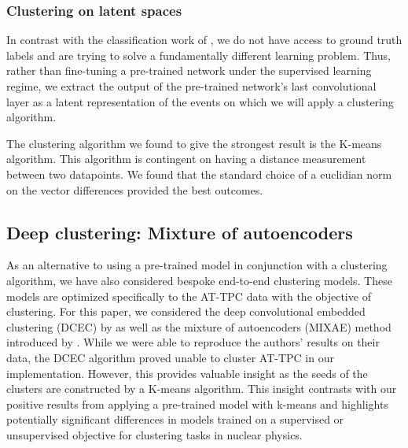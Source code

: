\documentclass[review,number,sort&compress]{elsarticle}
\begin{document}
\subsubsection{Clustering on latent spaces}



In contrast with the classification work of \citet{Kuchera2019}, we do not have access to ground truth labels and are trying to solve a fundamentally different learning problem. Thus, rather than fine-tuning a pre-trained network under the supervised learning regime, we extract the output of the pre-trained network's last convolutional layer as a latent representation of the events on which we will apply a clustering algorithm. 

The clustering algorithm we found to give the strongest result is the K-means algorithm. This algorithm is contingent on having a distance measurement between two datapoints. We found that the standard choice of a euclidian norm on the vector differences provided the best outcomes.



\subsection{Deep clustering: Mixture of autoencoders}\label{sec:mixae}

As an alternative to using a pre-trained model in conjunction with a clustering algorithm, we have also considered bespoke end-to-end clustering models. These models are optimized specifically to the AT-TPC data with the objective of clustering. For this paper, we considered the deep convolutional embedded clustering (DCEC) by \citet{Guo2017} as well as the mixture of autoencoders (MIXAE) method introduced by \citet{Zhang}. While we were able to reproduce the authors' results on their data, the DCEC algorithm proved unable to cluster AT-TPC in our implementation. However, this provides valuable insight as the seeds of the clusters are constructed by a K-means algorithm. This insight contrasts with our positive results from applying a pre-trained model with k-means and highlights potentially significant differences in models trained on a supervised or unsupervised objective for clustering tasks in nuclear physics. 
\end{document}
